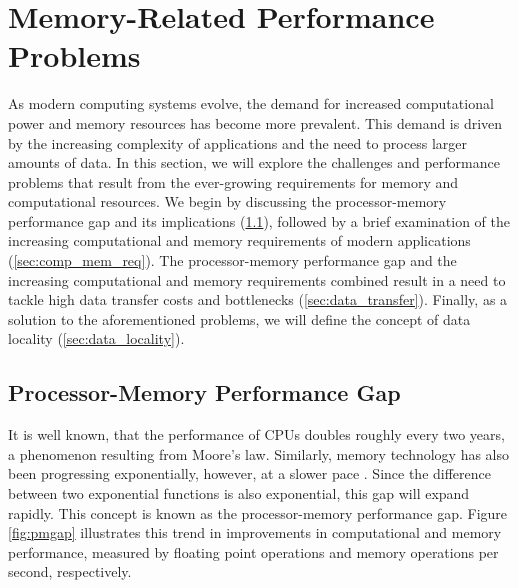 \section{Memory-Related Performance Problems}\label{sec:background}
As modern computing systems evolve, the demand for increased computational power and memory resources has become more prevalent. This demand is driven by the increasing complexity of applications and the need to process larger amounts of data. In this section, we will explore the challenges and performance problems that result from the ever-growing requirements for memory and computational resources. We begin by discussing the processor-memory performance gap and its implications (\ref{sec:pmgap}), followed by a brief examination of the increasing computational and memory requirements of modern applications (\ref{sec:comp_mem_req}). The processor-memory performance gap and the increasing computational and memory requirements combined result in a need to tackle high data transfer costs and bottlenecks (\ref{sec:data_transfer}). Finally, as a solution to the aforementioned problems, we will define the concept of data locality (\ref{sec:data_locality}).

\subsection{Processor-Memory Performance Gap}\label{sec:pmgap}
It is well known, that the performance of CPUs doubles roughly every two years, a phenomenon resulting from Moore's law. Similarly, memory technology has also been progressing exponentially, however, at a slower pace \cite{efnusheva2017survey, machanick2002approaches, mckee2004reflections, mccalpin1997survey}. Since the difference between two exponential functions is also exponential, this gap will expand rapidly. This concept is known as the processor-memory performance gap. Figure \ref{fig:pmgap} illustrates this trend in improvements in computational and memory performance, measured by floating point operations and memory operations per second, respectively.

